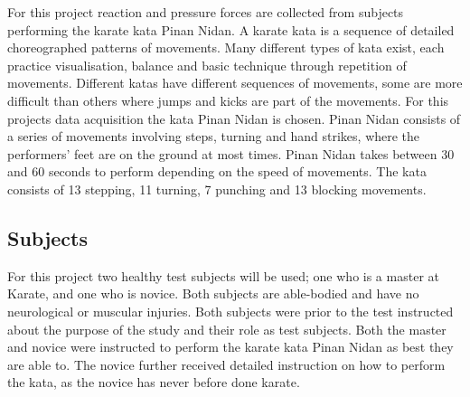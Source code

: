 

For this project reaction and pressure forces are collected from subjects performing the karate kata Pinan Nidan. %
A karate kata is a sequence of detailed choreographed patterns of movements. Many different types of kata exist, each practice visualisation, balance and basic technique through repetition of movements. Different katas have different sequences of movements, some are more difficult than others where jumps and kicks are part of the movements. For this projects data acquisition the kata Pinan Nidan is chosen. 
Pinan Nidan consists of a series of movements involving steps, turning and hand strikes, where the performers' feet are on the ground at most times. Pinan Nidan takes between 30 and 60 seconds to perform depending on the speed of movements. The kata consists of 13 stepping, 11 turning, 7 punching and 13 blocking movements. \cite{Mccarthy1987, seikenryu2017, Dojo2018}

\subsection{Subjects} %
For this project two healthy test subjects will be used; one who is a master at Karate, and one who is novice. Both subjects are able-bodied and have no neurological or muscular injuries. Both subjects were prior to the test instructed about the purpose of the study and their role as test subjects. Both the master and novice were instructed to perform the karate kata Pinan Nidan as best they are able to. The novice further received detailed instruction on how to perform the kata, as the novice has never before done karate. 






